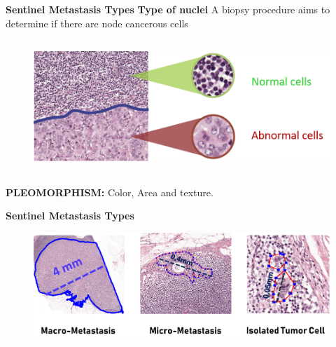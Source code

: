 \documentclass[usenames,dvipsnames]{beamer}
\begin{document}
\begin{frame}{\textbf{Sentinel Metastasis Types}} {\textbf{Type of nuclei}}
\large A biopsy procedure aims to determine if there are node cancerous cells
\begin{figure}
    \centering
    \includegraphics[height=5cm,width=13cm]{imagmetodo/nucleitypes.png}
    
\end{figure}
 \begin{block}
   
{\textcolor{mDarkTeal}{\textbf{\large PLEOMORPHISM:}}} Color, Area and texture.
    \end{block}
\end{frame}

\begin{frame}[fragile]{\textbf{Sentinel Metastasis Types }}


\begin{figure}
    \centering
   \includegraphics[width=1\textwidth ]{imagenes2/types.png} 
    \label{fig:my_label}
\end{figure}


 

  
\end{frame}
\end{document}

